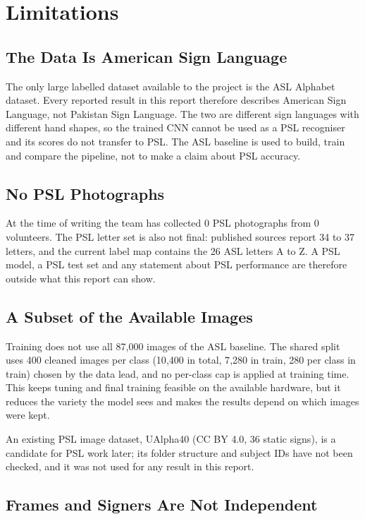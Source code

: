 \section{Limitations}
\label{sec:limitations}

\subsection{The Data Is American Sign Language}

The only large labelled dataset available to the project is the ASL Alphabet dataset. Every reported result in this report therefore describes American Sign Language, not Pakistan Sign Language. The two are different sign languages with different hand shapes, so the trained CNN cannot be used as a PSL recogniser and its scores do not transfer to PSL. The ASL baseline is used to build, train and compare the pipeline, not to make a claim about PSL accuracy.

\subsection{No PSL Photographs}

At the time of writing the team has collected 0 PSL photographs from 0 volunteers. The PSL letter set is also not final: published sources report 34 to 37 letters, and the current label map contains the 26 ASL letters A to Z. A PSL model, a PSL test set and any statement about PSL performance are therefore outside what this report can show.

\subsection{A Subset of the Available Images}

Training does not use all 87{,}000 images of the ASL baseline. The shared split uses 400 cleaned images per class (10{,}400 in total, 7{,}280 in train, 280 per class in train) chosen by the data lead, and no per-class cap is applied at training time. This keeps tuning and final training feasible on the available hardware, but it reduces the variety the model sees and makes the results depend on which images were kept.

An existing PSL image dataset, UAlpha40 (CC BY 4.0, 36 static signs), is a candidate for PSL work later; its folder structure and subject IDs have not been checked, and it was not used for any result in this report.

\subsection{Frames and Signers Are Not Independent}

